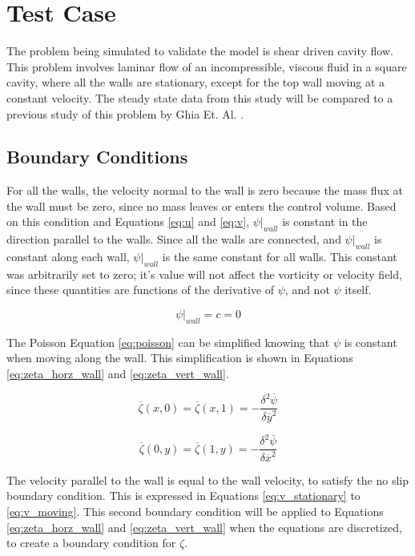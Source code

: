 \section{Test Case}
\label{sec:test_case}

The problem being simulated to validate the model is shear driven cavity flow.  This problem involves laminar flow of an incompressible, viscous fluid in a square cavity, where all the walls are stationary, except for the top wall moving at a constant velocity.  The steady state data from this study will be compared to a previous study of this problem by Ghia Et. Al. \cite{Ghia1982}.

	\subsection{Boundary Conditions}

For all the walls, the velocity normal to the wall is zero because the mass flux at the wall must be zero, since no mass leaves or enters the control volume.  Based on this condition and Equations \ref{eq:u} and \ref{eq:v}, $\psi|_{wall}$ is constant in the direction parallel to the walls. Since all the walls are connected, and $\psi|_{wall}$ is constant along each wall, $\psi|_{wall}$ is the same constant for all walls. This constant was arbitrarily set to zero; it's value will not affect the vorticity or velocity field, since these quantities are functions of the derivative of $\psi$, and not $\psi$ itself. 

\begin{equation}
\label{eq:bc_psi} 
\psi\Big|_{wall} = c = 0
\end{equation}

The Poisson Equation \ref{eq:poisson} can be simplified knowing that $\psi$ is constant when moving along the wall.  This simplification is shown in Equations \ref{eq:zeta_horz_wall} and \ref{eq:zeta_vert_wall}.

\begin{equation}
\label{eq:zeta_horz_wall} 
\overline{\zeta}(x,0) = \overline{\zeta}(x,1)  =
- \frac{\delta^2 \overline{\psi}}{\delta \overline{y}^2} 
\end{equation}

\begin{equation}
\label{eq:zeta_vert_wall} 
\overline{\zeta}(0,y) = \overline{\zeta}(1,y)  =
- \frac{\delta^2 \overline{\psi}}{\delta \overline{x}^2} 
\end{equation}


The velocity parallel to the wall is equal to the wall velocity, to satisfy the no slip boundary condition.  This is expressed in Equations \ref{eq:v_stationary} to \ref{eq:v_moving}.  This second boundary condition will be applied to Equations \ref{eq:zeta_horz_wall} and \ref{eq:zeta_vert_wall} when the equations are discretized, to create a boundary condition for $\zeta$.

